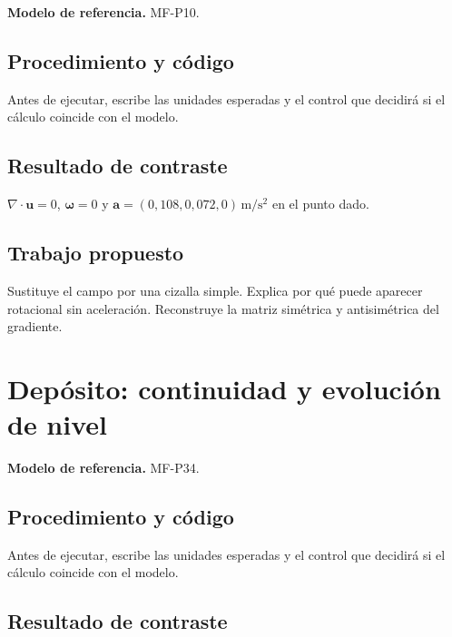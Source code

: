 \textbf{Modelo de referencia.} MF-P10.\par

\section{Procedimiento y código}

Antes de ejecutar, escribe las unidades esperadas y el control que decidirá si el cálculo coincide con el modelo.



\section{Resultado de contraste}

$\nabla\cdot\boldsymbol u=0$, $\boldsymbol\omega=0$ y $\boldsymbol a=(0{,}108,0{,}072,0)\,\mathrm{m/s^2}$ en el punto dado.

\section{Trabajo propuesto}

Sustituye el campo por una cizalla simple. Explica por qué puede aparecer rotacional sin aceleración. Reconstruye la matriz simétrica y antisimétrica del gradiente.

\studiumchaptercheck

\chapter{Depósito: continuidad y evolución de nivel}


\textbf{Modelo de referencia.} MF-P34.\par

\section{Procedimiento y código}

Antes de ejecutar, escribe las unidades esperadas y el control que decidirá si el cálculo coincide con el modelo.



\section{Resultado de contraste}

